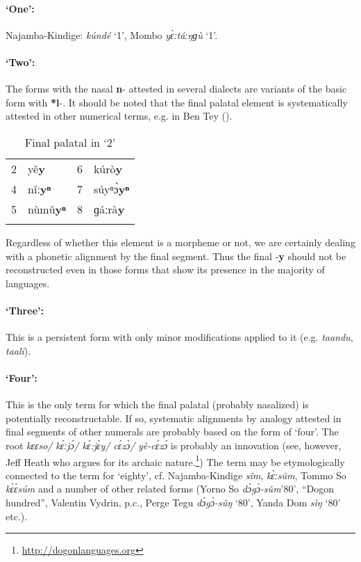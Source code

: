 \paragraph*{‘One’:} Najamba-Kindige: \textit{kúndé} ‘1’, Mombo \textit{y{\`{ɛ}}ːtáːŋɡù} ‘1’.

\paragraph*{‘Two’:} The forms with the nasal \textbf{n}- attested in several dialects are variants of the basic form with \textbf{*l}-. It should be noted that the final palatal element is systematically attested in other numerical terms, e.g. in Ben Tey ().

\begin{table}
\caption{\label{tab:3:149}Final palatal in `2'}


\begin{tabularx}{\textwidth}{lXlQ}
\lsptoprule

2 & y{\v{e}}\textbf{y} & 6 & kúrò\textbf{y}\\
4 & n{\v{i}}ː\textbf{yⁿ} & 7 & súyⁿ{\`{ɔ}}\textbf{yⁿ}\\
5 & nùm{\v{u}}\textbf{yⁿ} & 8 & ɡáːrà\textbf{y}\\
\lspbottomrule
\end{tabularx}
\end{table}

Regardless of whether this element is a morpheme or not, we are certainly dealing with a phonetic alignment by the final segment. Thus the final -\textbf{y} should not be reconstructed even in those forms that show its presence in the majority of languages. 

\paragraph*{‘Three’:} This is a persistent form with only minor modifications applied to it (e.g. \textit{taandu}, \textit{taali}). 

\paragraph*{‘Four’:} This is the only term for which the final palatal (probably nasalized) is potentially reconstructable. If so, systematic alignments by analogy attested in final segments of other numerals are probably based on the form of ‘four’. The root \textit{kɛɛso/} \textit{k{\'{ɛ}}ːj{\'{ɔ}}/} \textit{k{\'{ɛ}}:j{\`{ɛ}}y/} \textit{c{\'{ɛ}}z{\`{ɔ}}/} \textit{yè-c{\'{ɛ}}z{\'{ɔ}}} is probably an innovation (see, however, Jeff Heath who argues for its archaic nature.\footnote{\url{http://dogonlanguages.org}}) The term may be etymologically connected to the term for ‘eighty’, cf. Najamba-Kindige \textit{s{\^{i}}m}, \textit{k{\`{ɛ}}ːs{\v{u}}m}, Tommo So \textit{k{\`{ɛ}}{\`{ɛ}}súm} and a number of other related forms (Yorno So \textit{d{\`{ɔ}}g{\`{ɔ}}-s{\v{u}}m}’80’, “Dogon hundred”, Valentin Vydrin, p.c., Perge Tegu \textit{d{\`{ɔ}}g{\`{ɔ}}-s{\v{u}}ŋ} ‘80’, Yanda Dom \textit{sìŋ} ‘80’ etc.).

